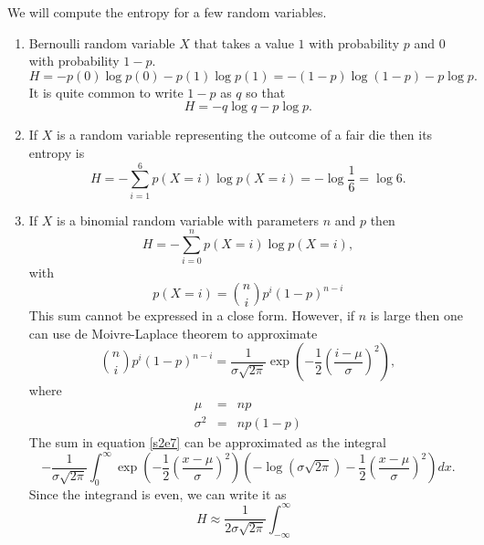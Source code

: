 \documentclass{article}
\numberwithin{equation}{section}
\theoremstyle{plain}
\numberwithin{thm}{section}
\theoremstyle{plain}
\numberwithin{prop}{section}
\theoremstyle{definition}
\numberwithin{defn}{section}
\theoremstyle{remark}
\begin{document}
We will compute the entropy for a few random variables.
\begin{enumerate}
\item Bernoulli random variable $X$ that takes a value $1$ with probability $p$
and $0$ with probability $1 - p$.
\begin{equation}\label{s2e4}
H = -p(0)\log p(0) - p(1)\log p(1) = -(1 - p)\log(1 - p) - p\log p.
\end{equation}
It is quite common to write $1 - p$ as $q$ so that
\begin{equation}\label{s2e5}
H = -q\log q - p\log p.
\end{equation}
\item If $X$ is a random variable representing the outcome of a fair die then
its entropy is
\begin{equation}\label{s2e6}
H = -\sum_{i=1}^6 p(X=i)\log p(X=i) = -\log\frac{1}{6} = \log 6.
\end{equation}
\item If $X$ is a binomial random variable with parameters $n$ and $p$ then
\begin{equation}\label{s2e7}
H = -\sum_{i=0}^n p(X=i)\log p(X=i),
\end{equation}
with
\begin{equation}\label{s2e8}
p(X=i) = \binom{n}{i}p^i(1 - p)^{n-i}
\end{equation}
This sum cannot be expressed in a close form. However, if $n$ is large then
one can use de Moivre-Laplace theorem to approximate
\begin{equation}\label{s2e9}
\binom{n}{i}p^i(1-p)^{n-i} = \frac{1}{\sigma\sqrt{2\pi}}
\exp\left(-\frac{1}{2}\left(\frac{i - \mu}{\sigma}\right)^2\right),
\end{equation}
where
\begin{eqnarray}
\mu &=& np \label{s2e10} \\
\sigma^2 &=& np(1-p) \label{s2e11}
\end{eqnarray}
The sum in equation \eqref{s2e7} can be approximated as the integral 
\begin{equation}\label{s2e12}
-\frac{1}{\sigma\sqrt{2\pi}}\int_0^\infty 
\exp\left(-\frac{1}{2}\left(\frac{x - \mu}{\sigma}\right)^2\right)
\left(-\log (\sigma\sqrt{2\pi}) - 
\frac{1}{2}\left(\frac{x - \mu}{\sigma}\right)^2\right)dx.
\end{equation}
Since the integrand is even, we can write it as
\begin{equation}\label{s2e13}
H \approx \frac{1}{2\sigma\sqrt{2\pi}}\int_{-\infty}^\infty

\end{equation}
\end{enumerate}
\end{document}
